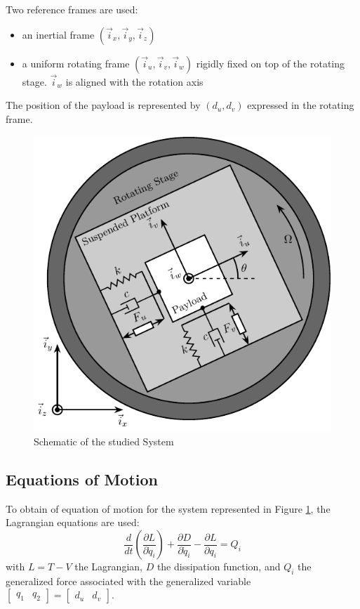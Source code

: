 \documentclass{ISMA_USD2020}
\begin{document}
Two reference frames are used:
\begin{itemize}
\item an inertial frame \((\vec{i}_x, \vec{i}_y, \vec{i}_z)\)
\item a uniform rotating frame \((\vec{i}_u, \vec{i}_v, \vec{i}_w)\) rigidly fixed on top of the rotating stage. \(\vec{i}_w\) is aligned with the rotation axis
\end{itemize}

The position of the payload is represented by \((d_u, d_v)\) expressed in the rotating frame.

\begin{figure}[htbp]
\centering
\includegraphics[scale=1]{figs/system.pdf}
\caption{\label{fig:system}Schematic of the studied System}
\end{figure}

\subsection{Equations of Motion}
\label{sec:org8561102}
To obtain of equation of motion for the system represented in Figure \ref{fig:system}, the Lagrangian equations are used:
\begin{equation}
\label{eq:lagrangian_equations}
  \frac{d}{dt} \left( \frac{\partial L}{\partial \dot{q}_i} \right) + \frac{\partial D}{\partial \dot{q}_i} - \frac{\partial L}{\partial q_i} = Q_i
\end{equation}
with \(L = T - V\) the Lagrangian, \(D\) the dissipation function, and \(Q_i\) the generalized force associated with the generalized variable \(\begin{bmatrix}q_1 & q_2\end{bmatrix} = \begin{bmatrix}d_u & d_v\end{bmatrix}\).
\end{document}
